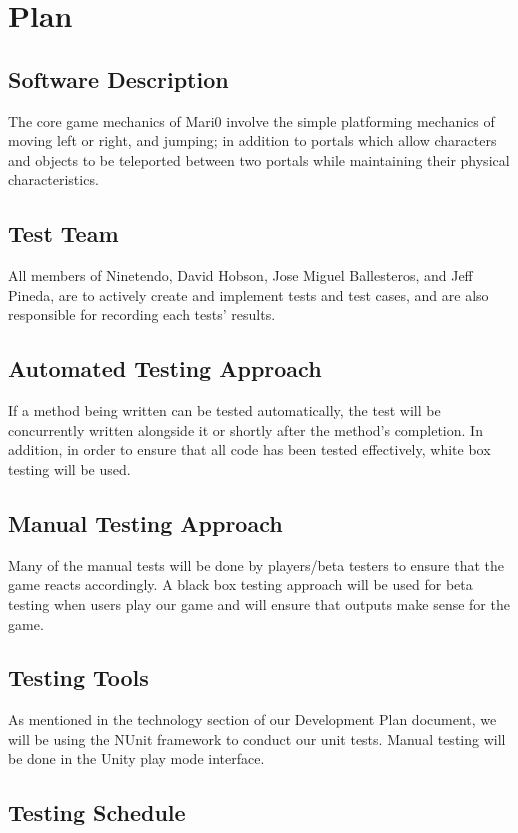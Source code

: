 \documentclass[12pt, titlepage]{article}
\begin{document}
\section{Plan}
	
\subsection{Software Description}
The core game mechanics of Mari0 involve the simple platforming mechanics of moving left or right, and jumping; in addition to portals which allow characters and objects to be teleported between two portals while maintaining their physical characteristics.
\subsection{Test Team}
All members of Ninetendo, David Hobson, Jose Miguel Ballesteros, and Jeff Pineda, are to actively create and implement tests and test cases, and are also responsible for recording each tests' results.
\subsection{Automated Testing Approach}
If a method being written can be tested automatically, the test will be concurrently written alongside it or shortly after the method's completion. In addition, in order to ensure that all code has been tested effectively, white box testing will be used. 
\subsection{Manual Testing Approach}
Many of the manual tests will be done by players/beta testers to ensure that the game reacts accordingly. A black box testing approach will be used for beta testing when users play our game and will ensure that outputs make sense for the game. 
\subsection{Testing Tools}
As mentioned in the technology section of our Development Plan document, we will be using the NUnit framework to conduct our unit tests. Manual testing will be done in the Unity play mode interface.
\subsection{Testing Schedule}
\end{document}
